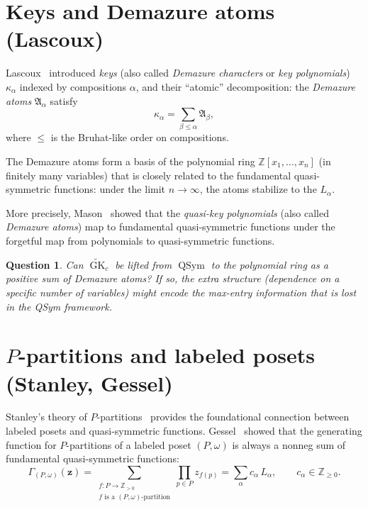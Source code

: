 \documentclass[11pt]{article}
\newtheorem{question}[theorem]{Question}
\newcommand{\Z}{\mathbb{Z}}
\newcommand{\GK}{\operatorname{GK}}
\newcommand{\QSym}{\operatorname{QSym}}
\begin{document}
\section{Keys and Demazure atoms (Lascoux)}
\label{sec:keys}

Lascoux~\cite{Las90} introduced \emph{keys} (also called
\emph{Demazure characters} or \emph{key polynomials})
$\kappa_\alpha$ indexed by compositions $\alpha$, and their
``atomic'' decomposition: the \emph{Demazure atoms}
$\mathfrak{A}_\alpha$ satisfy
\[
  \kappa_\alpha = \sum_{\beta \leq \alpha} \mathfrak{A}_\beta,
\]
where $\leq$ is the Bruhat-like order on compositions.

The Demazure atoms form a basis of the polynomial ring
$\Z[x_1, \ldots, x_n]$ (in finitely many variables) that is
closely related to the fundamental quasi-symmetric functions:
under the limit $n \to \infty$, the atoms stabilize to
the $L_\alpha$.

More precisely, Mason~\cite{Mas09} showed that
the \emph{quasi-key polynomials} (also called
\emph{Demazure atoms}) map to fundamental quasi-symmetric
functions under the forgetful map from polynomials to
quasi-symmetric functions.

\begin{question}
Can $\widetilde{\GK}_c$ be lifted from $\QSym$ to the polynomial
ring as a positive sum of Demazure atoms? If so, the extra
structure (dependence on a specific number of variables) might
encode the max-entry information that is lost in the QSym
framework.
\end{question}

\section{$P$-partitions and labeled posets (Stanley, Gessel)}
\label{sec:P-partitions}

Stanley's theory of $P$-partitions~\cite{Sta72} provides the
foundational connection between labeled posets and quasi-symmetric
functions. Gessel~\cite{Ges84} showed that the generating function
for $P$-partitions of a labeled poset $(P, \omega)$ is always
a nonneg sum of fundamental quasi-symmetric functions:
\[
  \Gamma_{(P,\omega)}(\mathbf{z})
  = \sum_{\substack{f: P \to \Z_{>0} \\ f \text{ is a
    $(P,\omega)$-partition}}} \prod_{p \in P} z_{f(p)}
  = \sum_\alpha c_\alpha\, L_\alpha,
  \qquad c_\alpha \in \Z_{\geq 0}.
\]
\end{document}
